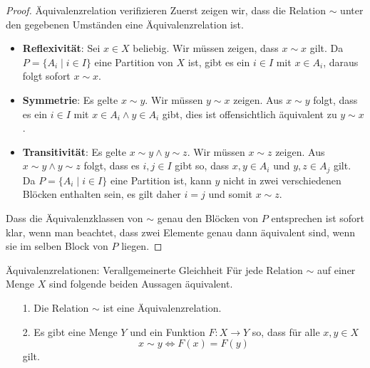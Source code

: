     \begin{proof}{Äquivalenzrelation verifizieren}
    Zuerst zeigen wir, dass die Relation $\sim$ unter den gegebenen Umständen eine Äquivalenzrelation ist.
    \begin{itemize}
    \item \textbf{Reflexivität}: Sei $x\in X$  beliebig. Wir müssen zeigen, dass $x\sim x$ gilt. Da $P=\{A_i\mid i\in I\}$ eine Partition von $X$ ist, gibt es ein $i\in I$ mit $x\in A_i$, daraus folgt sofort $x\sim x$.
    \item \textbf{Symmetrie}: Es gelte $x\sim y$. Wir müssen $y\sim x$ zeigen. Aus $x\sim y$ folgt, dass es ein $i\in I$ mit $x\in A_i\land y\in A_i$ gibt, dies ist offensichtlich äquivalent zu $y\sim x$.
    \item \textbf{Transitivität}: Es gelte $x\sim y\land y\sim z$. Wir müssen $x\sim z$ zeigen. Aus $x\sim y\land y\sim z$ folgt, dass es $i,j\in I$ gibt so, dass $x,y\in A_i$ und $y,z\in A_j$ gilt. Da $P=\{A_i\mid i\in I\}$ eine Partition ist, kann $y $ nicht in zwei verschiedenen Blöcken enthalten sein, es gilt daher $i=j$ und somit $x\sim z$.
    \end{itemize}
    Dass die Äquivalenzklassen von $\sim$ genau den Blöcken von $P$ entsprechen ist sofort klar, wenn man beachtet, dass zwei Elemente genau dann äquivalent sind, wenn sie im selben Block von $P$ liegen.
    \end{proof}

    \begin{lemma}{Äquivalenzrelationen: Verallgemeinerte Gleichheit}
    Für jede Relation $\sim$ auf einer Menge $X$ sind folgende beiden Aussagen äquivalent.
    \begin{enumerate}
    \item[1.] Die Relation $\sim$ ist eine Äquivalenzrelation.
    \item[2.] Es gibt eine Menge $Y$ und ein Funktion $F:X\to Y$ so, dass für alle $x,y\in X$
    \[
    x\sim y\Leftrightarrow F(x)=F(y)
    \]
    gilt.
    \end{enumerate}
    \end{lemma}
    
